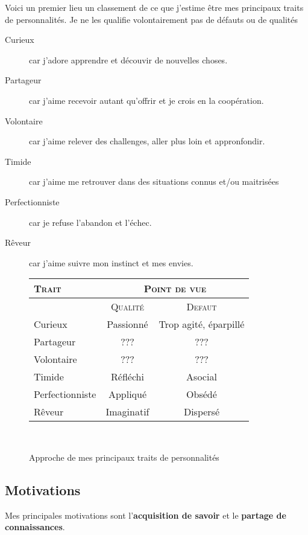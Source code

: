 \documentclass[a4paper,12pt, draft]{report}
\newcommand{\tabTitle}[1]{\hfill{} \textsc{#1} \hfill{} }
\begin{document}
Voici un premier lieu un classement de ce que j'estime être mes principaux traits de personnalités. Je ne les qualifie volontairement pas de défauts ou de qualités\\

\begin{description}
\item [Curieux]car j'adore apprendre et découvir de nouvelles choses.
\item [Partageur]car j'aime recevoir autant qu'offrir et je crois en la coopération.
\item [Volontaire]car j'aime relever des challenges, aller plus loin et appronfondir.
\item [Timide]car j'aime me retrouver dans des situations connus et/ou maitrisées
\item [Perfectionniste]car je refuse l'abandon et l'échec.
\item [Rêveur]car j'aime suivre mon instinct et mes envies.
\end{description}

\begin{figure}[h]
  \begin{tabular}{|l|c|c|}
    \hline

  \tabTitle{Trait} & \multicolumn{2}{c|}{\tabTitle{Point de vue}} \\
\hline
 & \tabTitle{Qualité} & \tabTitle{Defaut} \\
\hline
  Curieux & Passionné & Trop agité, éparpillé \\
  \hline
  Partageur & ??? & ???\\
  \hline
  Volontaire & ??? & ??? \\
  \hline
  Timide & Réfléchi & Asocial \\
  \hline
  Perfectionniste & Appliqué & Obsédé \\
  \hline
  Rêveur & Imaginatif & Dispersé \\
  \hline


    
  \end{tabular}\\
\caption{Approche de mes principaux traits de personnalités}
\end{figure}


\subsection{Motivations}
Mes principales motivations sont  l'\textbf{acquisition de savoir} et 
le \textbf{partage de connaissances}. 
\end{document}

